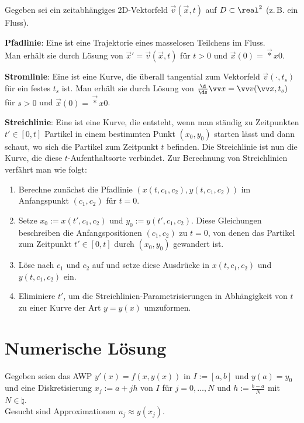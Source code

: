 Gegeben sei ein zeitabhängiges 2D-Vektorfeld $\vec{v}(\vec{x}, t)$ auf $D \subset \real^2$
(z.\,B. ein Fluss).

\textbf{Pfadlinie}:
Eine  ist eine Trajektorie eines masselosen Teilchens im Fluss.\\
Man erhält sie durch Lösung von $\vec{x}' = \vec{v}(\vec{x}, t)$ für $t > 0$ und
$\vec{x}(0) = \vec*{x}{0}$.

\textbf{Stromlinie}:
Eine  ist eine Kurve, die überall tangential zum
Vektorfeld $\vec{v}(\cdot, t_s)$ für ein festes $t_s$ ist.
Man erhält sie durch Lösung von $\frac{\d}{\ds}\vec{x} = \vec{v}(\vec{x}, t_s)$ für $s > 0$ und
$\vec{x}(0) = \vec*{x}{0}$.

\textbf{Streichlinie}:
Eine  ist eine Kurve, die entsteht, wenn man ständig zu Zeitpunkten
$t' \in [0, t]$ Partikel in einem bestimmten Punkt $(x_0, y_0)$ starten lässt
und dann schaut, wo sich die Partikel zum Zeitpunkt $t$ befinden.
Die Streichlinie ist nun die Kurve, die diese $t$-Aufenthaltsorte verbindet.
Zur Berechnung von Streichlinien verfährt man wie folgt:
\begin{enumerate}
    \item
    Berechne zunächst die Pfadlinie $(x(t, c_1, c_2), y(t, c_1, c_2))$
    im Anfangspunkt $(c_1, c_2)$ für $t = 0$.

    \item
    Setze $x_0 := x(t', c_1, c_2)$ und $y_0 := y(t', c_1, c_2)$.
    Diese Gleichungen beschreiben die Anfangspositionen $(c_1, c_2)$ zu $t = 0$,
    von denen das Partikel zum Zeitpunkt $t' \in [0, t]$ durch $(x_0, y_0)$ gewandert ist.

    \item
    Löse nach $c_1$ und $c_2$ auf und setze diese Ausdrücke in $x(t, c_1, c_2)$ und
    $y(t, c_1, c_2)$ ein.

    \item
    Eliminiere $t'$, um die Streichlinien-Parametrisierungen in Abhängigkeit von $t$
    zu einer Kurve der Art $y = y(x)$ umzuformen.
\end{enumerate}

\section{%
    Numerische Lösung%
}

Gegeben seien das AWP $y'(x) = f(x, y(x))$ in $I := [a, b]$ und $y(a) = y_0$
und eine Diskretisierung $x_j := a + jh$ von $I$ für $j = 0, \dotsc, N$ und $h := \frac{b-a}{N}$
mit $N \in \natural$.\\
Gesucht sind Approximationen $u_j \approx y(x_j)$.

